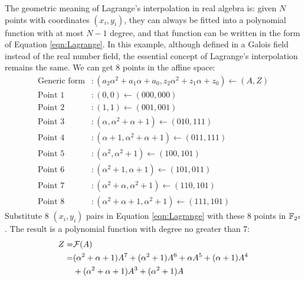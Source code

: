 \begin{Example}
\begin{table}[tbp]
\caption{Truth table for mappings in $\mathbb{B}^3$ and $\F_{2^3}$.}
\label{tab:truthtable}
\end{table}

The geometric meaning of Lagrange's interpolation in real algebra is: given $N$ points with coordinates $(x_i,y_i)$,
they can always be fitted into a polynomial function with at most $N-1$ degree, and that function can be 
written in the form of Equation \ref{eqn:Lagrange}. In this example, although defined in a Galois field instead of 
the real number field, the essential concept of Lagrange's interpolation remains the same. 
We can get 8 points in the affine space:
\begin{align*}
\text{Generic form}&: (a_2\alpha^2+a_1\alpha+a_0,z_2\alpha^2+z_1\alpha+z_0) \gets (A,Z) \\
\text{Point }1&: (0, 0) \gets (000,000) \\
\text{Point }2&: (1,1) \gets (001,001) \\
\text{Point }3&:  (\alpha,\alpha^2 + \alpha + 1) \gets (010,111)\\
\text{Point }4&:  (\alpha + 1,\alpha^2 + \alpha + 1)\gets (011,111) \\
\text{Point }5&:  (\alpha^2,\alpha^2+1) \gets (100,101)\\
\text{Point }6&:  (\alpha^2 + 1,\alpha+1)\gets (101,011)\\
\text{Point }7&:  (\alpha^2 + \alpha,\alpha^2 + 1)\gets (110,101)\\
\text{Point }8&:  (\alpha^2 + \alpha + 1,\alpha^2 + 1)\gets (111,101)
\end{align*}
Substitute 8 $(x_i,y_i)$ pairs in Equation \ref{eqn:Lagrange} with these 8 points in $\F_{2^3}$.
The result is a polynomial function with degree no greater than 7:
\begin{align*}
Z =& {\mathcal{F}}(A) \\
=& (\alpha^2+\alpha+1) A^7 + (\alpha^2+1) A^6 + \alpha A^5 + (\alpha+1) A^4 \\
&+ (\alpha^2+\alpha+1)A^3+ (\alpha^2+1)A
\end{align*}


\end{Example}
